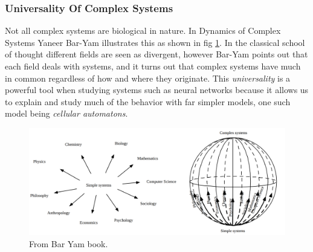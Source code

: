 \subsubsection{Universality Of Complex Systems}
Not all complex systems are biological in nature.
In Dynamics of Complex Systems Yaneer Bar-Yam illustrates this as shown in fig
\ref{figCX}.
In the classical school of thought different fields are seen as divergent,
however Bar-Yam points out that each field deals with systems, and it turns out
that complex systems have much in common regardless of how and where they
originate.
This \emph{universality} is a powerful tool when studying systems such as neural
networks because it allows us to explain and study much of the behavior with far
simpler models, one such model being \emph{cellular automatons}.
\begin{figure}[h!]
  \centering
  \includegraphics[width=1\textwidth]{fig/BarYamCX.png}
  \caption{From Bar Yam book.}
  \label{figCX}
\end{figure}
